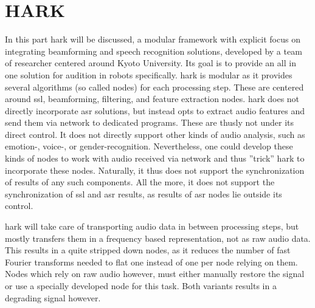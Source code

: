 
\section{HARK}
\label{related:frameworks}
In this part \gls{hark} \cite{Nakadai_2017jrm} will be discussed, a modular framework with explicit focus on integrating beamforming and speech recognition solutions, developed by a team of researcher centered around Kyoto University.
Its goal is to provide an all in one solution for audition in robots specifically.
\gls{hark} is modular as it provides several algorithms (so called nodes) for each processing step.
These are centered around \gls{ssl}, beamforming, filtering, and feature extraction nodes.
\gls{hark} does not directly incorporate \gls{asr} solutions, but instead opts to extract audio features and send them via network to dedicated programs.
These are thusly not under its direct control.
It does not directly support other kinds of audio analysis, such as emotion-, voice-, or gender-recognition.
Nevertheless, one could develop these kinds of nodes to work with audio received via network and thus ''trick'' \gls{hark} to incorporate these nodes.
Naturally, it thus does not support the synchronization of results of any such components.
All the more, it does not support the synchronization of \gls{ssl} and \gls{asr} results, as results of \gls{asr} nodes lie outside its control.

\gls{hark} will take care of transporting audio data in between processing steps, but mostly transfers them in a frequency based representation, not as raw audio data.
This results in a quite stripped down nodes, as it reduces the number of fast Fourier transforms needed to flat one instead of one per node relying on them.
Nodes which rely on raw audio however, must either manually restore the signal or use a specially developed node for this task.
Both variants results in a degrading signal however.




